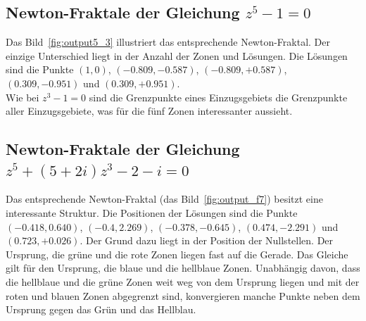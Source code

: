 \documentclass[a4paper,12pt]{llncs}
\numberwithin{equation}{section}
\begin{document}
\subsection{Newton-Fraktale der Gleichung $z^5 -1 = 0$}
Das Bild~\ref{fig:output5_3} illustriert das entsprechende Newton-Fraktal. 
Der einzige Unterschied liegt in der Anzahl der Zonen und Lösungen.
Die Lösungen sind die Punkte $(1, 0)$, $(-0.809,-0.587)$, $(-0.809,+0.587)$, $(0.309,-0.951)$ und $(0.309,+0.951)$. \\
Wie bei $z^3-1=0$ sind die Grenzpunkte eines Einzugsgebiets die Grenzpunkte aller Einzugsgebiete, was für die fünf Zonen interessanter aussieht.

\subsection{Newton-Fraktale der Gleichung $z^5 + (5+2i)z^3 - 2-i = 0$}
Das entsprechende Newton-Fraktal (das Bild~\ref{fig:output_f7}) besitzt eine interessante Struktur. 
Die Positionen der Lösungen sind die Punkte  $(-0.418,0.640)$, $(-0.4,2.269)$, $(-0.378,-0.645)$, $(0.474,-2.291)$ und $(0.723,+0.026)$.
Der Grund dazu liegt in der Position der Nullstellen.
Der Ursprung, die grüne und die rote Zonen liegen fast auf die Gerade.
Das Gleiche gilt für den Ursprung, die blaue und die hellblaue Zonen.
Unabhängig davon, dass die hellblaue und die grüne Zonen weit weg von dem Ursprung liegen und mit der roten und blauen Zonen abgegrenzt sind, konvergieren manche Punkte neben dem Ursprung gegen das Grün und das Hellblau.
\end{document}
